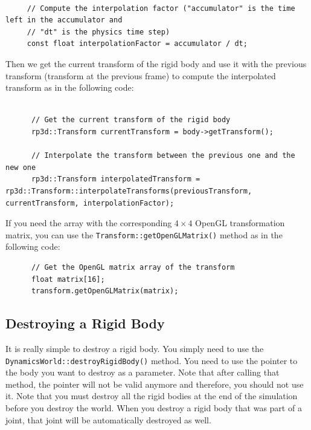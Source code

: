 \documentclass[a4paper,12pt]{article}
\begin{document}
    \begin{lstlisting}

     // Compute the interpolation factor ("accumulator" is the time left in the accumulator and
     // "dt" is the physics time step)
     const float interpolationFactor = accumulator / dt;
   \end{lstlisting}

   \vspace{0.6cm}

   Then we get the current transform of the rigid body and use it with the previous transform (transform at the previous frame) to
   compute the interpolated transform as in the following code: \\

    \begin{lstlisting}

      // Get the current transform of the rigid body
      rp3d::Transform currentTransform = body->getTransform();

      // Interpolate the transform between the previous one and the new one
      rp3d::Transform interpolatedTransform = rp3d::Transform::interpolateTransforms(previousTransform, currentTransform, interpolationFactor);
    \end{lstlisting}

    \vspace{0.6cm}

    If you need the array with the corresponding $4 \times 4$ OpenGL transformation matrix, you can use the \texttt{Transform::getOpenGLMatrix()} method as in the
    following code: \\

    \begin{lstlisting}
      // Get the OpenGL matrix array of the transform
      float matrix[16];
      transform.getOpenGLMatrix(matrix);
  \end{lstlisting}

    \subsection{Destroying a Rigid Body}

    \begin{sloppypar}
    It is really simple to destroy a rigid body. You simply need to use the \texttt{DynamicsWorld::destroyRigidBody()} method. You need to use the pointer to the body you
    want to destroy as a parameter. Note that after calling that method, the pointer will not be valid anymore and therefore, you should not use it. Note that you must
    destroy all the rigid bodies at the end of the simulation before you destroy the world. When you destroy a rigid body that was part of a joint, that joint will be
    automatically destroyed as well. \\
    \end{sloppypar}
\end{document}
